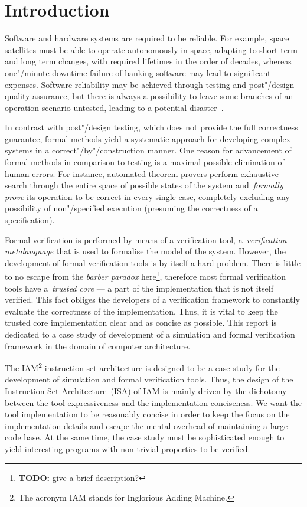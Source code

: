 \section{Introduction}

Software and hardware systems are required to be reliable.
For example, space satellites must be able to operate autonomously in space,
adapting to short term and long term changes,
with required lifetimes in the order of decades, whereas
one"/minute downtime failure of banking software may lead to significant expenses.
Software reliability may be achieved through testing and post"/design quality
assurance, but there is always a possibility to leave some branches of an operation
scenario untested, leading to a potential disaster~\cite{Leveson2004}.

In contrast with post"/design testing, which does not provide the full
correctness guarantee, formal methods yield a systematic approach for developing
complex systems in a correct"/by"/construction manner. One reason for advancement
of formal methods in comparison to testing is a maximal possible elimination of
human errors. For instance, automated theorem provers perform exhaustive search
through the entire space of possible states of the system and~\emph{formally prove} its
operation to be correct in every single case, completely excluding any possibility of
non"/specified execution (presuming the correctness of a specification).

Formal verification is performed by means of a verification tool,
a~\emph{verification metalanguage} that is used to formalise the model of the system.
However, the development of formal verification tools is by itself a hard problem.
There is little to no escape from the \emph{barber paradox} here\footnote{\textbf{TODO:}
give a brief description?}, therefore most formal
verification tools have a~\emph{trusted core} --- a part of the implementation that
is not itself verified. This fact obliges the developers of a verification framework
to constantly evaluate the correctness of the implementation. Thus, it is vital
to keep the trusted core implementation clear and as concise as possible. This report
is dedicated to a case study of development of a simulation and formal verification
framework in the domain of computer architecture.

The IAM\footnote{The acronym IAM stands for Inglorious Adding Machine.} instruction
set architecture is designed to be a case study for the development of simulation
and formal verification tools. Thus, the design of the Instruction Set
Architecture~(ISA) of IAM is mainly driven by the dichotomy between the tool
expressiveness and the implementation conciseness.
We want the tool implementation to be reasonably concise in order to keep the
focus on the implementation details and escape the mental overhead of maintaining
a large code base. At the same time, the case study must be sophisticated enough
to yield interesting programs with non-trivial properties to be verified.

